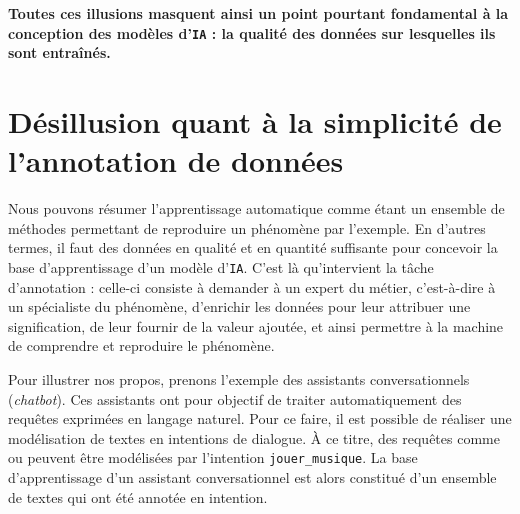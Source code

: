 		\textbf{Toutes ces illusions masquent ainsi un point pourtant fondamental à la conception des modèles d'\texttt{IA} : la qualité des données sur lesquelles ils sont entraînés.}
		
		
	\section*{Désillusion quant à la simplicité de l'annotation de données}
		
		Nous pouvons résumer l'apprentissage automatique comme étant un ensemble de méthodes permettant de reproduire un phénomène par l'exemple.
		En d'autres termes, il faut des données en qualité et en quantité suffisante pour concevoir la base d'apprentissage d'un modèle d'\texttt{IA}.
		C'est là qu'intervient la tâche d'annotation : celle-ci consiste à demander à un expert du métier, c'est-à-dire à un spécialiste du phénomène, d'enrichir les données pour leur attribuer une signification, de leur fournir de la valeur ajoutée, et ainsi permettre à la machine de comprendre et reproduire le phénomène.
		\newline
		
		Pour illustrer nos propos, prenons l'exemple des assistants conversationnels (\textit{chatbot}).
		Ces assistants ont pour objectif de traiter automatiquement des requêtes exprimées en langage naturel.
		Pour ce faire, il est possible de réaliser une modélisation de textes en intentions de dialogue.
		À ce titre, des requêtes comme  ou  peuvent être modélisées par l'intention \texttt{jouer\_musique}.
		La base d'apprentissage d'un assistant conversationnel est alors constitué d'un ensemble de textes qui ont été annotée en intention.
		
